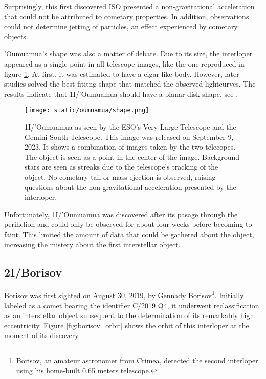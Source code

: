 Surprisingly, this first discovered ISO presented a non-gravitational
acceleration that could not be attributed to cometary properties. In addition,
observations could not determine jetting of particles, an effect experienced by
cometary objects.

'Oumuamua's shape was also a matter of debate. Due to its size, the interloper
appeared as a single point in all telescope images, like the one reproduced in
figure \ref{fig:oumuamua_shape}. At first, it was estimated to have a cigar-like
body. However, later studies solved the best fititng shape that matched the
observed lightcurves. The results indicate that 1I/'Oumuamua should have a planar
disk shape, see \cite{mashchenko2019}.

\begin{figure}[H]
  \centering
  \texttt{[image: static/oumuamua/shape.png]}
  \caption['Oumuamua as seen by the ESO's VLT and GST telescopes]{
    1I/'Oumuamua as seen by the ESO's Very Large Telescope and the Gemini South
    Telescope. This image was released on September 9, 2023. It shows a
    combination of images taken by the two telecopes. The object is seen as
    a point in the center of the image. Background stars are seen as streaks
    due to the telescope's tracking of the object. No cometary tail or mass
    ejection is observed, raising questions about the non-gravitational
    acceleration presented by the interloper.
  }
  \label{fig:oumuamua_shape}
\end{figure}

Unfortunately, 1I/'Oumuamua was discovered after its pasage through the perihelion
and could only be observed for about four weeks before becoming to faint. This
limited the amount of data that could be gathered about the object, increasing
the mistery about the first interstellar object.

\subsection{2I/Borisov}

Borisov was first sighted on August 30, 2019, by Gennady
Borisov\footnote{Borisov, an amateur astronomer from Crimea, detected the second
  interloper using his home-built 0.65 meters telescope.}. Initially labeled as a
comet bearing the identifier C/2019 Q4, it underwent reclassification as an
interstellar object subsequent to the determination of its remarkably high
eccentricity. Figure \ref{fig:borisov_orbit} shows the orbit of this interloper
at the moment of its discovery.

